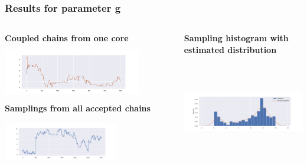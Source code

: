 \documentclass{beamer}
\begin{document}
\begin{frame}
	\frametitle{Results for parameter g}
	\begin{columns}
		\begin{column}{0.4\textwidth}
			{\scriptsize \textbf{Coupled chains from one core}}\\
			\includegraphics[width=6cm,height=2.5cm]{gk_all_pack/gk_all_chain_meeeting_2}
			\vspace{0.2cm}
			{\scriptsize \textbf{Samplings from all accepted chains}}\\
			\includegraphics[width=5cm,height=2.5cm]{gk_all_pack/gk_all_sampling_2}
		\end{column}
		\begin{column}{0.4\textwidth}
			{	\scriptsize \textbf{Sampling histogram with estimated distribution }}\\
			\includegraphics[width=6cm,height=5cm]{gk_all_pack/gk_all_histogram_kernel_2}
			
		\end{column}
	\end{columns}
\end{frame}
\end{document}
